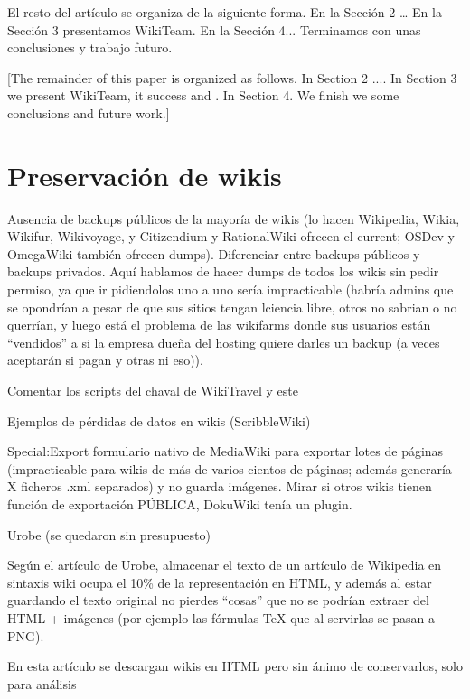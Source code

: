 \documentclass[11pt,twocolumn]{article}
\begin{document}
El resto del artículo se organiza de la siguiente forma. En la Sección 2 … En la Sección 3 presentamos WikiTeam. En la Sección 4... Terminamos con unas conclusiones y trabajo futuro.

[The remainder of this paper is organized as follows. In Section 2 .... In Section 3 we present WikiTeam, it success and . In Section 4. We finish we some conclusions and future work.]

\section{Preservación de wikis}

Ausencia de backups públicos de la mayoría de wikis (lo hacen Wikipedia, Wikia, Wikifur, Wikivoyage, y Citizendium y RationalWiki ofrecen el current; OSDev y OmegaWiki también ofrecen dumps). Diferenciar entre backups públicos y backups privados. Aquí hablamos de hacer dumps de todos los wikis sin pedir permiso, ya que ir pidiendolos uno a uno sería impracticable (habría admins que se opondrían a pesar de que sus sitios tengan lciencia libre, otros no sabrian o no querrían, y luego está el problema de las wikifarms donde sus usuarios están “vendidos” a si la empresa dueña del hosting quiere darles un backup (a veces aceptarán si pagan y otras ni eso)).

Comentar los scripts del chaval de WikiTravel %
y este %

Ejemplos de pérdidas de datos en wikis (ScribbleWiki)

Special:Export formulario nativo de MediaWiki para exportar lotes de páginas (impracticable para wikis de más de varios cientos de páginas; además generaría X ficheros .xml separados) y no guarda imágenes. Mirar si otros wikis tienen función de exportación PÚBLICA, DokuWiki tenía un plugin.

Urobe (se quedaron sin presupuesto)

Según el artículo de Urobe, almacenar el texto de un artículo de Wikipedia en sintaxis wiki ocupa el 10\% de la representación en HTML, y además al estar guardando el texto original no pierdes “cosas” que no se podrían extraer del HTML + imágenes (por ejemplo las fórmulas TeX que al servirlas se pasan a PNG).

En esta artículo se descargan wikis en HTML pero sin ánimo de conservarlos, solo para análisis %
\end{document}

